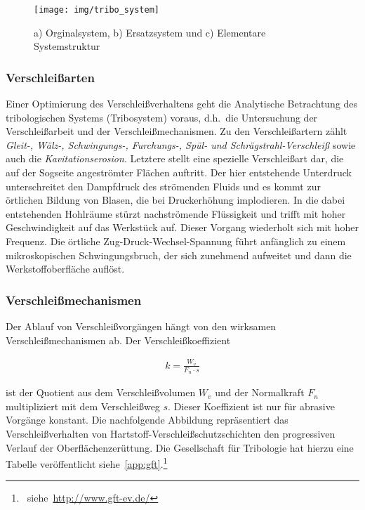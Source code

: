 \documentclass[12pt,a4paper,bibliography=totocnumbered,listof=totocnumbered,fleqn]{scrartcl}
\begin{document}
\begin{figure}[h]
\centering
\texttt{[image: img/tribo\_system]}
\caption{a) Orginalsystem, b) Ersatzsystem und c) Elementare Systemstruktur}
\label{fig:tribo_system}
\end{figure}

\subsubsection{Verschleißarten}
\label{sec:verart}

Einer Optimierung des Verschleißverhaltens geht die Analytische Betrachtung des tribologischen Systems (Tribosystem) voraus, d.h.\ die Untersuchung der Verschleißarbeit und der Verschleißmechanismen. Zu den Verschleißartern zählt \emph{Gleit-, Wälz-, Schwingungs-, Furchungs-, Spül- und Schrägstrahl-Verschleiß} sowie auch die \emph{Kavitationserosion}. Letztere stellt eine spezielle Verschleißart dar, die auf der Sogseite angeströmter Flächen auftritt. Der hier entstehende Unterdruck unterschreitet den Dampfdruck des strömenden Fluids und es kommt zur örtlichen Bildung von Blasen, die bei Druckerhöhung implodieren. In die dabei entstehenden Hohlräume stürzt nachströmende Flüssigkeit und trifft mit hoher Geschwindigkeit auf das Werkstück auf. Dieser Vorgang wiederholt sich mit hoher Frequenz. Die örtliche Zug-Druck-Wechsel-Spannung führt anfänglich zu einem mikroskopischen Schwingungsbruch, der sich zunehmend aufweitet und dann die Werkstoffoberfläche auflöst.  

\subsubsection{Verschleißmechanismen}
\label{sec:vermech}

Der Ablauf von Verschleißvorgängen hängt von den wirksamen Verschleißmechanismen ab. Der Verschleißkoeffizient

\begin{align}
k=\frac{W_{v}}{F_{n}\cdot s}
\end{align}

ist der Quotient aus dem Verschleißvolumen $W_{v}$ und der Normalkraft $F_{n}$ multipliziert mit dem Verschleißweg $s$. Dieser Koeffizient ist nur für abrasive Vorgänge konstant. Die nachfolgende Abbildung repräsentiert das Verschleißverhalten von Hartstoff-Verschleißschutzschichten den progressiven Verlauf der Oberflächenzerüttung.
Die Gesellschaft für Tribologie hat hierzu eine Tabelle veröffentlicht siehe~\ref{app:gft}.\footnote{~siehe~\url{http://www.gft-ev.de/}}
\end{document}
